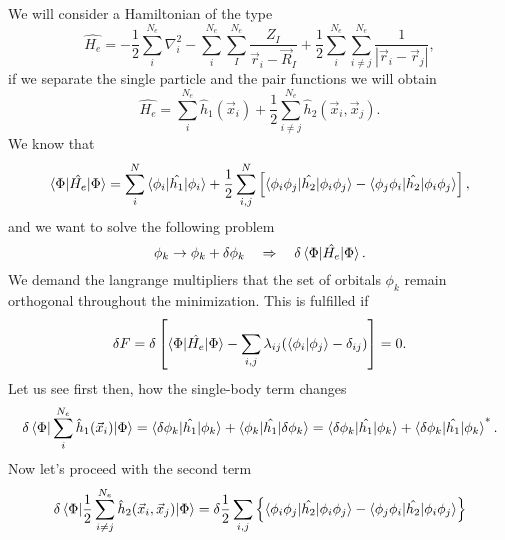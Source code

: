 
\begin{questions}
\begin{solution}
  We will consider a Hamiltonian of the type
  \begin{equation}
    \hat{H_e} = -\frac{1}{2} \sum_i^{N_e} \nabla^2_i - \sum_i^{N_e}\sum_{I}^{N_e} \frac{Z_I}{ \vec{r}_i - \vec{R}_I } + \frac{1}{2}\sum_i^{N_e}\sum_{i\neq j}^{N_e} \frac{1}{|\vec{r}_i -\vec{r}_j|},
  \end{equation}
  if we separate the single particle and the pair functions we will obtain
  \begin{equation}
    \hat{H_e} =  \sum_i^{N_e} \hat{h}_1(\vec{x}_i) + \frac{1}{2}\sum_{i\neq j}^{N_e} \hat{h}_2(\vec{x}_i,\vec{x}_j).
  \end{equation}
  We know that
  \begin{equation}
    \braket{\Phi|\hat{H_e}|\Phi} = \sum_i^N \braket{\phi_i|\hat{h_1}|\phi_i} + \frac{1}{2} \sum_{i,j}^N \left[ \braket{\phi_i \phi_j|\hat{h_2}|\phi_i \phi_j} -  \braket{\phi_j \phi_i|\hat{h_2}|\phi_i \phi_j}\right],
  \end{equation}
  and we want to solve the following problem
  \begin{equation}
    \phi_k \rightarrow \phi_k + \delta \phi_k \quad \Rightarrow \quad \delta \braket{\Phi|\hat{H_e}|\Phi}.
  \end{equation}
  We demand the langrange multipliers that the set of orbitals $\phi_k$ remain orthogonal throughout the minimization. This is fulfilled if
  \begin{equation}
    \delta F = \delta \left[ \braket{\Phi|\hat{H_e}|\Phi} - \sum_{i,j} \lambda_{ij} ( \braket{\phi_i|\phi_j} - \delta_{ij})  \right] = 0.
  \end{equation}
  Let us see first then, how the single-body term changes
  \begin{equation}
    \delta \braket{\Phi|\sum_i^{N_e} \hat{h}_1(\vec{x}_i)|\Phi} = \braket{\delta \phi_k|\hat{h_1}|\phi_k} + \braket{\phi_k|\hat{h_1}|\delta \phi_k} = \braket{\delta \phi_k|\hat{h_1}|\phi_k} + \braket{\delta \phi_k|\hat{h_1}|\phi_k}^*.
  \end{equation}
  Now let's proceed with the second term
  \begin{equation}
    \begin{aligned}[b]
      \delta \braket{\Phi|\frac{1}{2}\sum_{i\neq j}^{N_e} \hat{h}_2(\vec{x}_i,\vec{x}_j)|\Phi} &= \delta \frac{1}{2} \sum_{i,j} \left\{ \braket{\phi_i \phi_j|\hat{h_2}|\phi_i \phi_j} -  \braket{\phi_j \phi_i|\hat{h_2}|\phi_i \phi_j}  \right\} \\

\end{aligned}
\end{equation}
\end{solution}
\end{questions}

